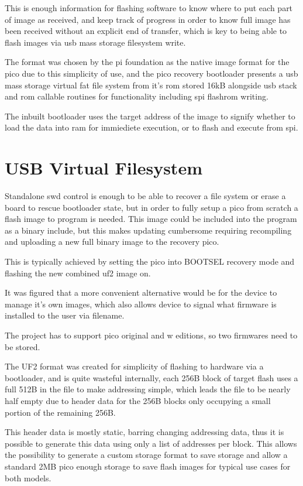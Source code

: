 This is enough information for flashing software to know where to put each part of image as received, and keep track of progress in order to know full image has been received without an explicit end of transfer, which is key to being able to flash images via \gls{usb} mass storage filesystem write.

The format was chosen by the pi foundation as the native image format for the pico due to this simplicity of use, and the pico recovery bootloader presents a \gls{usb} mass storage virtual \gls{fat} file system from it's \gls{rom} stored 16kB alongside \gls{usb} stack and \gls{rom} callable routines for functionality including \gls{spi} flashrom writing.

The inbuilt bootloader uses the target address of the image to signify whether to load the data into ram for immiediete execution, or to flash and execute from \gls{spi}.

\clearpage
\section{USB Virtual Filesystem}
Standalone \gls{swd} control is enough to be able to recover a file system or erase a board to rescue bootloader state, but in order to fully setup a pico from scratch a flash image to program is needed. This image could be included into the program as a binary include, but this makes updating cumbersome requiring recompiling and uploading a new full binary image to the recovery pico.

This is typically achieved by setting the pico into BOOTSEL recovery mode and flashing the new combined uf2 image on.

It was figured that a more convenient alternative would be for the device to manage it's own images, which also allows device to signal what firmware is installed to the user via filename.

The project has to support pico original and w editions, so two firmwares need to be stored.

The UF2 format was created for simplicity of flashing to hardware via a bootloader, and is quite wasteful internally, each 256B block of target flash uses a full 512B in the file to make addressing simple, which leads the file to be nearly half empty due to header data for the 256B blocks only occupying a small portion of the remaining 256B.

This header data is mostly static, barring changing addressing data, thus it is possible to generate this data using only a list of addresses per block. This allows the possibility to generate a custom storage format to save storage and allow a standard 2MB pico enough storage to save flash images for typical use cases for both models.

